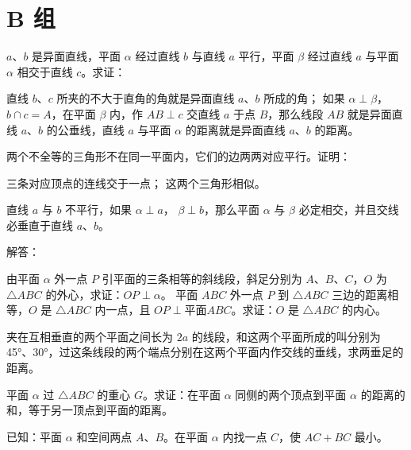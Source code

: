 \section*{B 组}
\begin{question}[resume]
  \item $a$、$b$ 是异面直线，平面 $\alpha$ 经过直线 $b$ 与直线 $a$ 平行，平面 $\beta$ 经过直线 $a$ 与平面 $\alpha$ 相交于直线 $c$。求证：
  \begin{tasks}
    \task 直线 $b$、$c$ 所夹的不大于直角的角就是异面直线 $a$、$b$ 所成的角；
    \task 如果 $\alpha \perp \beta$，$b\cap c=A$，在平面 $\beta$ 内，作 $AB\perp c$ 交直线 $a$ 于点 $B$，那么线段 $AB$ 就是异面直线 $a$、$b$ 的公垂线，直线 $a$ 与平面 $\alpha$ 的距离就是异面直线 $a$、$b$ 的距离。
  \end{tasks}
  \item 两个不全等的三角形不在同一平面内，它们的边两两对应平行。证明：
  \begin{tasks}
    \task 三条对应顶点的连线交于一点；
    \task 这两个三角形相似。
  \end{tasks}
  \item 直线 $a$ 与 $b$ 不平行，如果 $\alpha\perp a$， $\beta\perp b$，那么平面 $\alpha$ 与 $\beta$ 必定相交，并且交线必垂直于直线 $a$、$b$。
  \item 解答：
  \begin{tasks}
    \task 由平面 $\alpha$ 外一点 $P$ 引平面的三条相等的斜线段，斜足分别为 $A$、$B$、$C$，$O$ 为 $\triangle ABC$ 的外心，求证：$OP\perp \alpha$。
    \task 平面 $ABC$ 外一点 $P$ 到 $\triangle ABC$ 三边的距离相等，$O$ 是 $\triangle ABC$ 内一点，且 $OP\perp \text{平面}ABC$。求证：$O$ 是 $\triangle ABC$ 的内心。
  \end{tasks}
  \item 夹在互相垂直的两个平面之间长为 $2a$ 的线段，和这两个平面所成的叫分别为 \ang{45}、\ang{30}，过这条线段的两个端点分别在这两个平面内作交线的垂线，求两垂足的距离。
  \item 平面 $\alpha$ 过 $\triangle ABC$ 的重心 $G$。求证：在平面 $\alpha$ 同侧的两个顶点到平面 $\alpha$ 的距离的和，等于另一顶点到平面的距离。
  \item 已知：平面 $\alpha$ 和空间两点 $A$、$B$。在平面 $\alpha$ 内找一点 $C$，使 $AC+BC$ 最小。
\end{question}